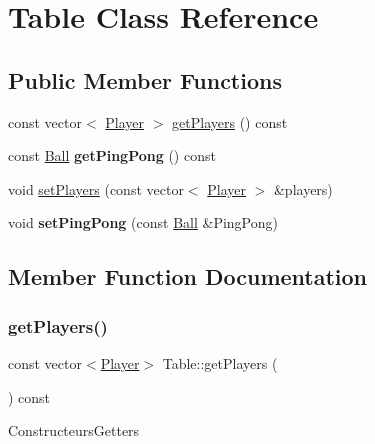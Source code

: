 \hypertarget{classTable}{}\section{Table Class Reference}
\label{classTable}
\subsection*{Public Member Functions}
\begin{DoxyCompactItemize}
\item 
const vector$<$ \mbox{\hyperlink{classPlayer}{Player}} $>$ \mbox{\hyperlink{classTable_af67738037e0a1942ffb02f58530fd447}{get\+Players}} () const
\item 
\mbox{\label{classTable_a579ccd3bd452dbfb17c6c98976da707b}} 
const \mbox{\hyperlink{classBall}{Ball}} {\bfseries get\+Ping\+Pong} () const
\item 
void \mbox{\hyperlink{classTable_aa5f4a76a0a202018bdac4832718169ea}{set\+Players}} (const vector$<$ \mbox{\hyperlink{classPlayer}{Player}} $>$ \&players)
\item 
\mbox{\label{classTable_a3ada4aec14f2bfa87a7afbd50a126613}} 
void {\bfseries set\+Ping\+Pong} (const \mbox{\hyperlink{classBall}{Ball}} \&Ping\+Pong)
\end{DoxyCompactItemize}


\subsection{Member Function Documentation}
\mbox{\label{classTable_af67738037e0a1942ffb02f58530fd447}} 
\subsubsection{\texorpdfstring{get\+Players()}{getPlayers()}}
{\footnotesize\ttfamily const vector$<$\mbox{\hyperlink{classPlayer}{Player}}$>$ Table\+::get\+Players (\begin{DoxyParamCaption}{ }\end{DoxyParamCaption}) const\hspace{0.3cm}{\ttfamily [inline]}}

Constructeurs\+Getters \mbox{\label{classTable_aa5f4a76a0a202018bdac4832718169ea}} 
